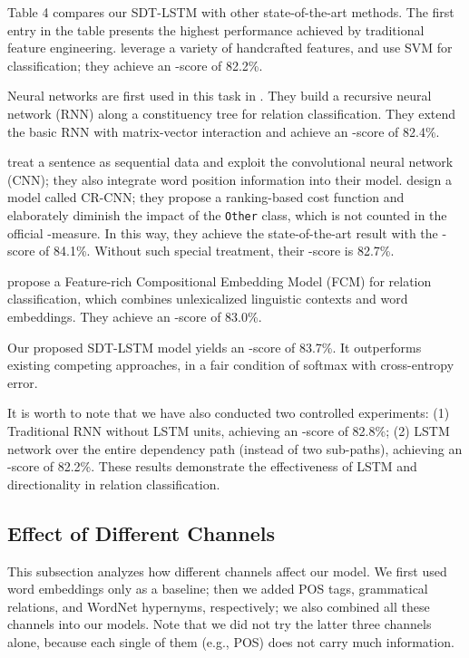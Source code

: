 \documentclass[11pt,a4paper]{article}
\begin{document}
Table 4 compares our SDT-LSTM with other state-of-the-art methods.
The first entry in the table presents
the highest performance achieved by traditional feature engineering.
 leverage a variety of handcrafted features, and use SVM for classification; they achieve an -score of 82.2\%.

Neural networks are first used in this task in . They build
a recursive neural network (RNN) along a constituency tree for relation classification.
They extend the basic RNN with matrix-vector interaction and achieve an -score of 82.4\%.

 treat a sentence as sequential data and exploit the convolutional neural network (CNN);
they also integrate word position information into their model. 
 design a model called CR-CNN;
they propose a ranking-based cost function and
elaborately diminish the impact of the \verb|Other| class, which
is not counted in the official -measure.
In this way, they achieve the state-of-the-art result with the -score of 84.1\%.
Without such special treatment, their -score is 82.7\%.

 propose a Feature-rich Compositional Embedding Model (FCM) for relation classification, which combines unlexicalized linguistic contexts and word embeddings. They achieve an -score of 83.0\%.


Our proposed SDT-LSTM model yields an -score of 83.7\%. It outperforms existing competing
approaches, in a fair condition of softmax with cross-entropy error.


It is worth to note that we have also conducted two controlled experiments: 
(1) Traditional RNN without LSTM units, achieving an -score of 82.8\%; 
(2) LSTM network over the entire dependency path (instead of two sub-paths), 
achieving an
-score of 82.2\%. These results demonstrate the effectiveness of
LSTM and directionality in 
relation classification.

\subsection{Effect of Different Channels}\label{ssChannel}



This subsection analyzes how different channels affect our model.
We first used word embeddings only as a baseline;
then we added POS tags, grammatical relations, and WordNet hypernyms, respectively;
we also combined all these channels into our models.
Note that we did not try the latter three channels alone, 
because each single of them
(e.g., POS) does not carry much information.
\end{document}
